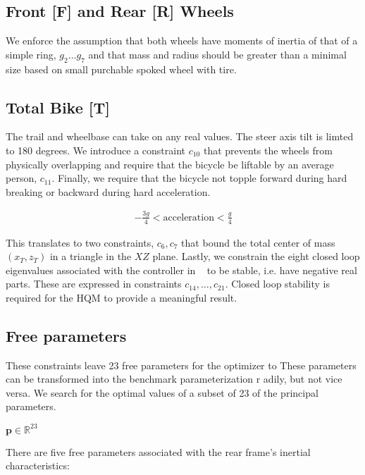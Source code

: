 \documentclass{bmd2019a}
\begin{document}
\subsection{Front [F] and Rear [R] Wheels}

We enforce the assumption that both wheels have moments of inertia of that of a
simple ring, $g_2 \ldots g_7$ and that mass and radius should be greater than a
minimal size based on small purchable spoked wheel with tire.

\subsection{Total Bike [T]}

The trail and wheelbase can take on any real values. The steer axis tilt is
limted to 180 degrees. We introduce a constraint $c_{10}$ that prevents the
wheels from physically overlapping and require that the bicycle be liftable by
an average person, $c_{11}$. Finally, we require that the bicycle not topple
forward during hard breaking or backward during hard acceleration.

\begin{align}
  -\frac{3g}{4} < \textrm{acceleration} < \frac{g}{4}
\end{align}

This translates to two constraints, $c_6,c_7$ that bound the total center of
mass $(x_T,z_T)$ in a triangle in the $XZ$ plane. Lastly, we constrain the
eight closed loop eigenvalues associated with the controller in
~\cite{Hess2012} to be stable, i.e. have negative real parts.  These are
expressed in constraints $c_{14},\ldots,c_{21}$. Closed loop stability is
required for the HQM to provide a meaningful result.

\subsection{Free parameters}
%
These constraints leave 23 free parameters for the optimizer to These
parameters can be transformed into the benchmark parameterization r adily, but
not vice versa.
We search for the optimal values of a subset of 23 of the principal parameters.

$\mathbf{p}\in\mathbb{R}^{23}$

There are five free parameters associated with the rear frame's inertial
characteristics:
\end{document}
